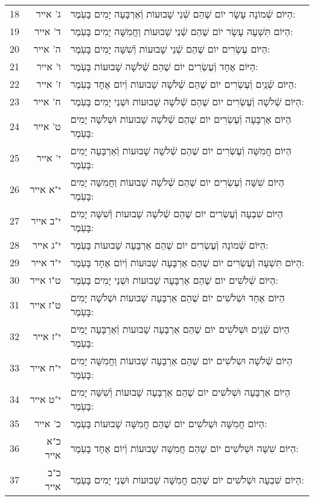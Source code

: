 \documentclass[twoside, openany, parskip=half, 11pt]{book}
\begin{document}
\begin{scriptsize}
\begin{longtable}{ l | r | p{} }
18 & ג' אייר & הַיּוֹם שְֿׁמוֹנָה עָשָׂר יוֹם שֶׁהֵם שְֿׁנֵי שָׁבוּעוֹת וְֿאַרְבָּעָה יָמִים בָּעֹֽמֶר: \\
19 & ד' אייר & הַיּוֹם תִּשְׁעָה עָשָׂר יוֹם שֶׁהֵם שְֿׁנֵי שָׁבוּעוֹת וַחֲמִשָּׁה יָמִים בָּעֹֽמֶר: \\
20 & ה' אייר & הַיּוֹם עֶשְׂרִים יוֹם שֶׁהֵם שְֿׁנֵי שָׁבוּעוֹת וְֿשִׁשָּׁה יָמִים בָּעֹֽמֶר: \\
21 & ו' אייר & הַיּוֹם אֶחָד וְֿעֶשְׂרִים יוֹם שֶׁהֵם שְֿׁלֹשָׁה שָׁבוּעוֹת בָּעֹֽמֶר: \\
22 & ז' אייר & הַיּוֹם שְֿׁנַֽיִם וְֿעֶשְׂרִים יוֹם שֶׁהֵם שְֿׁלֹשָׁה שָׁבוּעוֹת וְֿיוֹם אֶחָד בָּעֹֽמֶר: \\
23 & ח' אייר & הַיּוֹם שְֿׁלֹשָׁה וְֿעֶשְׂרִים יוֹם שֶׁהֵם שְֿׁלֹשָׁה שָׁבוּעוֹת וּשְׁנֵי יָמִים בָּעֹֽמֶר: \\
24 & ט' אייר & הַיּוֹם אַרְבָּעָה וְֿעֶשְׂרִים יוֹם שֶׁהֵם שְֿׁלֹשָׁה שָׁבוּעוֹת וּשְׁלֹשָׁה יָמִים בָּעֹֽמֶר: \\
25 & י' אייר & הַיּוֹם חֲמִשָּׁה וְֿעֶשְׂרִים יוֹם שֶׁהֵם שְֿׁלֹשָׁה שָׁבוּעוֹת וְֿאַרְבָּעָה יָמִים בָּעֹֽמֶר: \\
26 & י"א אייר & הַיּוֹם שִׁשָּׁה וְֿעֶשְׂרִים יוֹם שֶׁהֵם שְֿׁלֹשָׁה שָׁבוּעוֹת וַחֲמִשָּׁה יָמִים בָּעֹֽמֶר: \\
27 & י"ב אייר & הַיּוֹם שִׁבְעָה וְֿעֶשְׂרִים יוֹם שֶׁהֵם שְֿׁלֹשָׁה שָׁבוּעוֹת וְֿשִׁשָּׁה יָמִים בָּעֹֽמֶר: \\
28 & י"ג אייר & הַיּוֹם שְֿׁמוֹנָה וְֿעֶשְׂרִים יוֹם שֶׁהֵם אַרְבָּעָה שָׁבוּעוֹת בָּעֹֽמֶר: \\
29 & י"ד אייר & הַיּוֹם תִּשְׁעָה וְֿעֶשְׂרִים יוֹם שֶׁהֵם אַרְבָּעָה שָׁבוּעוֹת וְֿיוֹם אֶחָד בָּעֹֽמֶר: \\
30 & ט"ו אייר & הַיּוֹם שְֿׁלֹשִׁים יוֹם שֶׁהֵם אַרְבָּעָה שָׁבוּעוֹת וּשְׁנֵי יָמִים בָּעֹֽמֶר: \\
31 & ט"ז אייר & הַיּוֹם אֶחָד וּשְׁלֹשִׁים יוֹם שֶׁהֵם אַרְבָּעָה שָׁבוּעוֹת וּשְׁלֹשָׁה יָמִים בָּעֹֽמֶר: \\
32 & י"ז אייר & הַיּוֹם שְֿׁנַֽיִם וּשְׁלֹשִׁים יוֹם שֶׁהֵם אַרְבָּעָה שָׁבוּעוֹת וְֿאַרְבָּעָה יָמִים בָּעֹֽמֶר: \\
33 & י"ח אייר & הַיּוֹם שְֿׁלֹשָׁה וּשְלֹשִׁים יוֹם שֶׁהֵם אַרְבָּעָה שָׁבוּעוֹת וַחֲמִשָּׁה יָמִים בָּעֹֽמֶר: \\
34 & י"ט אייר & הַיּוֹם אַרְבָּעָה וּשְׁלֹשִׁים יוֹם שֶׁהֵם אַרְבָּעָה שָׁבוּעוֹת וְֿשִׁשָּׁה יָמִים בָּעֹֽמֶר: \\
35 & כ' אייר & הַיּוֹם חֲמִשָּׁה וּשְׁלֹשִׁים יוֹם שֶׁהֵם חֲמִשָּׁה שָׁבוּעוֹת בָּעֹֽמֶר: \\
36 & כ"א אייר & הַיּוֹם שִׁשָּׁה וּשְׁלֹשִׁים יוֹם שֶׁהֵם חֲמִשָּׁה שָׁבוּעוֹת וְֿיוֹם אֶחָד בָּעֹֽמֶר: \\
37 & כ"ב אייר & הַיּוֹם שִׁבְעָה וּשְׁלֹשִׁים יוֹם שֶׁהֵם חֲמִשָּׁה שָׁבוּעוֹת וּשְׁנֵי יָמִים בָּעֹֽמֶר: \\

\end{longtable}
\end{scriptsize}
\end{document}
